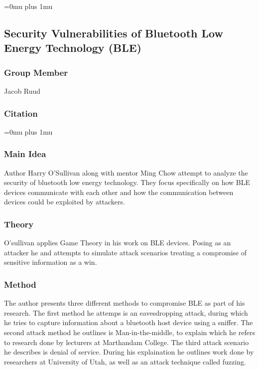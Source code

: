 \Urlmuskip=0mu plus 1mu\relax

\subsection{Security Vulnerabilities of Bluetooth Low Energy Technology (BLE)}

\subsubsection{Group Member}

\noindent
Jacob Ruud

\noindent
\subsubsection{Citation}

\Urlmuskip=0mu plus 1mu\relax


\subsubsection{Main Idea}

\noindent
Author Harry O'Sullivan along with mentor Ming Chow attempt to analyze the security of bluetooth low energy technology. They focus specifically on how BLE devices communicate with each other and how the communication between devices could be exploited by attackers.

\subsubsection{Theory}

\noindent
O'sullivan applies Game Theory in his work on BLE devices. Posing as an attacker he and attempts to simulate attack scenarios treating a compromise of sensitive information as a win.

\subsubsection{Method}

\noindent
The author presents three different methods to compromise BLE as part of his research. The first method he attemps is an eavesdropping attack, during which he tries to capture information about a bluetooth host device using a sniffer. The second attack method he outlines is Man-in-the-middle, to explain which he refers to research done by lecturers at Marthandam College. The third attack scenario he describes is denial of service. During his explaination he outlines work done by researchers at University of Utah, as well as an attack technique called fuzzing.

